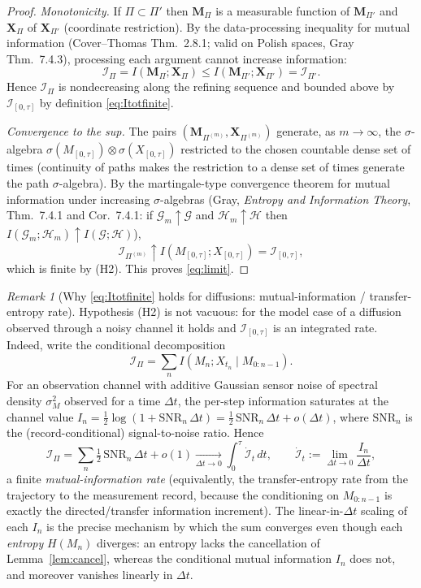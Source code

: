 \documentclass{amsart}
\theoremstyle{definition}
\theoremstyle{remark}
\newtheorem{remark}{Remark}
\begin{document}
\begin{proof}
\emph{Monotonicity.} If $\Pi\subset\Pi'$ then $\mathbf M_\Pi$ is a
measurable function of $\mathbf M_{\Pi'}$ and $\mathbf X_\Pi$ of
$\mathbf X_{\Pi'}$ (coordinate restriction). By the data-processing
inequality for mutual information (Cover--Thomas Thm.~2.8.1; valid on
Polish spaces, Gray Thm.~7.4.3), processing each argument cannot
increase information:
\[
\mathcal I_\Pi=I(\mathbf M_\Pi;\mathbf X_\Pi)
\le I(\mathbf M_{\Pi'};\mathbf X_{\Pi'})=\mathcal I_{\Pi'}.
\]
Hence $\mathcal I_\Pi$ is nondecreasing along the refining sequence and
bounded above by $\mathcal I_{[0,\tau]}$ by definition
\eqref{eq:Itotfinite}.

\emph{Convergence to the sup.} The pairs
$(\mathbf M_{\Pi^{(m)}},\mathbf X_{\Pi^{(m)}})$ generate, as
$m\to\infty$, the $\sigma$-algebra
$\sigma(M_{[0,\tau]})\otimes\sigma(X_{[0,\tau]})$ restricted to the
chosen countable dense set of times (continuity of paths makes the
restriction to a dense set of times generate the path $\sigma$-algebra).
By the martingale-type convergence theorem for mutual information under
increasing $\sigma$-algebras (Gray, \emph{Entropy and Information
Theory}, Thm.~7.4.1 and Cor.~7.4.1: if
$\mathcal G_m\uparrow\mathcal G$ and $\mathcal H_m\uparrow\mathcal H$
then $I(\mathcal G_m;\mathcal H_m)\uparrow I(\mathcal G;\mathcal H)$),
\[
\mathcal I_{\Pi^{(m)}}\uparrow I(M_{[0,\tau]};X_{[0,\tau]})
=\mathcal I_{[0,\tau]},
\]
which is finite by (H2). This proves \eqref{eq:limit}.
\end{proof}

\begin{remark}[Why \eqref{eq:Itotfinite} holds for diffusions:
mutual-information / transfer-entropy rate]\label{rem:rate}
Hypothesis (H2) is not vacuous: for the model case of a diffusion
observed through a noisy channel it holds and $\mathcal I_{[0,\tau]}$ is
an integrated rate. Indeed, write the conditional decomposition
\[
\mathcal I_\Pi=\sum_{n} I\!\left(M_n;X_{t_n}\mid M_{0:n-1}\right).
\]
For an observation channel with additive Gaussian sensor noise of
spectral density $\sigma_M^2$ observed for a time $\Delta t$, the
per-step information saturates at the channel value
$I_n=\tfrac12\log(1+\mathrm{SNR}_n\,\Delta t)
=\tfrac12\,\mathrm{SNR}_n\,\Delta t+o(\Delta t)$, where
$\mathrm{SNR}_n$ is the (record-conditional) signal-to-noise ratio. Hence
\[
\mathcal I_\Pi=\sum_n \tfrac12\,\mathrm{SNR}_n\,\Delta t+o(1)
\xrightarrow[\Delta t\to0]{}
\int_0^\tau \dot{\mathcal I}_t\,dt,
\qquad
\dot{\mathcal I}_t:=\lim_{\Delta t\to0}\frac{I_n}{\Delta t},
\]
a finite \emph{mutual-information rate} (equivalently, the
transfer-entropy rate from the trajectory to the measurement record,
because the conditioning on $M_{0:n-1}$ is exactly the directed/transfer
information increment). The linear-in-$\Delta t$ scaling of each $I_n$ is
the precise mechanism by which the sum converges even though each
\emph{entropy} $H(M_n)$ diverges: an entropy lacks the cancellation of
Lemma~\ref{lem:cancel}, whereas the conditional mutual information $I_n$
does not, and moreover vanishes linearly in $\Delta t$.
\end{remark}
\end{document}
